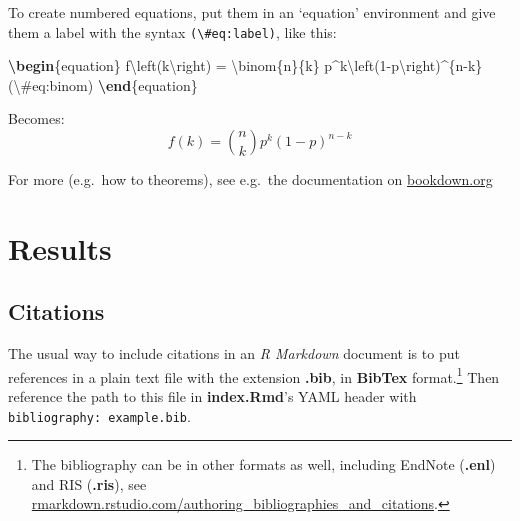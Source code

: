 \documentclass[a4paper, nobind]{templates/ociamthesis}
\newenvironment{Shaded}{\begin{snugshade}}{\end{snugshade}}
\newcommand{\ExtensionTok}[1]{#1}
\newcommand{\KeywordTok}[1]{\textcolor[rgb]{0.13,0.29,0.53}{\textbf{#1}}}
\newcommand{\NormalTok}[1]{#1}
\newcommand{\SpecialCharTok}[1]{\textcolor[rgb]{0.00,0.00,0.00}{#1}}
\newcommand{\SpecialStringTok}[1]{\textcolor[rgb]{0.31,0.60,0.02}{#1}}
\renewenvironment{Shaded}
{
  \vspace{10pt}%
  \begin{snugshade}%
}{%
  \end{snugshade}%
  \vspace{8pt}%
}
\begin{document}
To create numbered equations, put them in an `equation' environment and give them a label with the syntax \texttt{(\textbackslash{}\#eq:label)}, like this:

\begin{Shaded}
\begin{Highlighting}[]
\KeywordTok{\textbackslash{}begin}\NormalTok{\{}\ExtensionTok{equation}\NormalTok{\}}\SpecialStringTok{ }
\SpecialStringTok{  f}\SpecialCharTok{\textbackslash{}left}\SpecialStringTok{(k}\SpecialCharTok{\textbackslash{}right}\SpecialStringTok{) = }\SpecialCharTok{\textbackslash{}binom}\SpecialStringTok{\{n\}\{k\} p\^{}k}\SpecialCharTok{\textbackslash{}left}\SpecialStringTok{(1{-}p}\SpecialCharTok{\textbackslash{}right}\SpecialStringTok{)\^{}\{n{-}k\}}
\SpecialStringTok{  (}\SpecialCharTok{\textbackslash{}\#}\SpecialStringTok{eq:binom)}
\KeywordTok{\textbackslash{}end}\NormalTok{\{}\ExtensionTok{equation}\NormalTok{\} }
\end{Highlighting}
\end{Shaded}

Becomes:
\begin{equation}
f\left(k\right)=\binom{n}{k}p^k\left(1-p\right)^{n-k}
\label{eq:binom}
\end{equation}

For more (e.g.~how to theorems), see e.g.~the documentation on \href{https://bookdown.org/yihui/bookdown/markdown-extensions-by-bookdown.html\#equations}{bookdown.org}

\hypertarget{cites-and-refs}{%
\chapter{Results}\label{cites-and-refs}}

\minitoc 

\hypertarget{citations}{%
\section{Citations}\label{citations}}

The usual way to include citations in an \emph{R Markdown} document is to put references in a plain text file with the extension \textbf{.bib}, in \textbf{BibTex} format.\footnote{The bibliography can be in other formats as well, including EndNote (\textbf{.enl}) and RIS (\textbf{.ris}), see \href{https://rmarkdown.rstudio.com/authoring_bibliographies_and_citations.html}{rmarkdown.rstudio.com/authoring\_bibliographies\_and\_citations}.}
Then reference the path to this file in \textbf{index.Rmd}'s YAML header with \texttt{bibliography:\ example.bib}.
\end{document}
